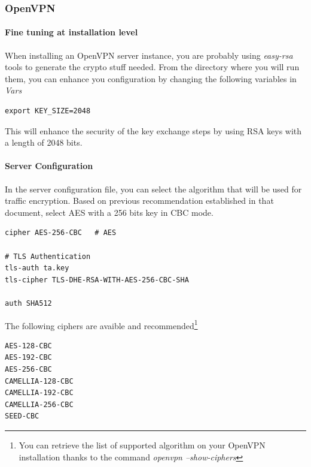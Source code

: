 \subsubsection{OpenVPN}

\paragraph{Fine tuning at installation level}

When installing an OpenVPN server instance, you are probably using {\it easy-rsa} tools to generate the crypto stuff needed.
From the directory where you will run them, you can enhance you configuration by changing the following variables in {\it Vars}

\begin{lstlisting}[breaklines]
export KEY_SIZE=2048 
\end{lstlisting}

This will enhance the security of the key exchange steps by using RSA keys with a length of 2048 bits.

\paragraph{Server Configuration}

In the server configuration file, you can select the algorithm that will be used for traffic encryption.
Based on previous recommendation established in that document, select AES with a 256 bits key in CBC mode.

\begin{lstlisting}[breaklines]
cipher AES-256-CBC   # AES

# TLS Authentication
tls-auth ta.key
tls-cipher TLS-DHE-RSA-WITH-AES-256-CBC-SHA

auth SHA512
\end{lstlisting}


The following ciphers are avaible and recommended\footnote{You can retrieve the list of supported algorithm on your OpenVPN installation thanks to the command {\it openvpn --show-ciphers}}
\begin{lstlisting}[breaklines]
AES-128-CBC
AES-192-CBC
AES-256-CBC
CAMELLIA-128-CBC
CAMELLIA-192-CBC
CAMELLIA-256-CBC
SEED-CBC
\end{lstlisting}


